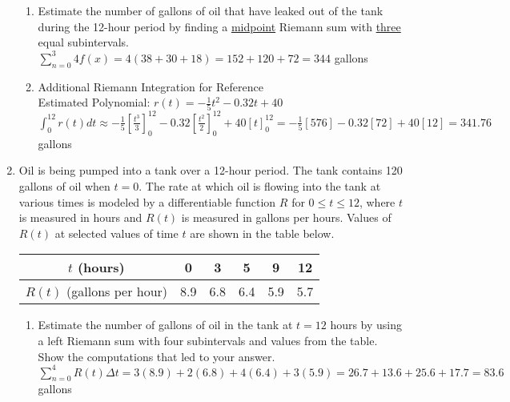 \documentclass[10pt, letterpaper]{report}
\begin{document}
\begin{enumerate}
\begin{enumerate}
      \item{Estimate the number of gallons of oil that have leaked out of the tank during the 12-hour period by finding a \underline{midpoint} Riemann sum with \underline{three} equal subintervals.} \\

        $\sum_{n=0}^{3}4f(x)=
        4(38+30+18)=
        152+120+72=344$ gallons \\

      \item{Additional Riemann Integration for Reference} \\

        Estimated Polynomial: $r(t)=-\frac{1}{5}t^{2}-0.32t+40$ \\

        $\int_{0}^{12}r(t)dt\approx
        -\frac{1}{5}[\frac{t^{3}}{3}]_{0}^{12}-0.32[\frac{t^{2}}{2}]_{0}^{12}+40[t]_{0}^12=
        -\frac{1}{5}[576]-0.32[72]+40[12]=341.76$ gallons \\
    \end{enumerate}
\pagebreak
  \item{Oil is being pumped into a tank over a 12-hour period. The tank contains 120 gallons of oil when $t=0$. The rate at which oil is flowing into the tank at various times is modeled by a differentiable function $R$ for $0\leq t\leq 12$, where $t$ is measured in hours and $R(t)$ is measured in gallons per hours. Values of $R(t)$ at selected values of time $t$ are shown in the table below.
    \begin{center}
      \begin{tabular}{| c | c | c | c | c | c |}
        \hline
        $t$ (hours) & 0 & 3 & 5 & 9 & 12 \\
        \hline
        $R(t)$ (gallons per hour) & 8.9 & 6.8 & 6.4 & 5.9 & 5.7 \\
        \hline
      \end{tabular}
    \end{center}}
    \begin{enumerate}
      \item{Estimate the number of gallons of oil in the tank at $t=12$ hours by using a left Riemann sum with four subintervals and values from the table. Show the computations that led to your answer.} \\

        $\sum_{n=0}^{4}R(t)\Delta t=
        3(8.9)+2(6.8)+4(6.4)+3(5.9)=
        26.7+13.6+25.6+17.7=83.6$ gallons \\


\end{enumerate}
\end{enumerate}
\end{document}
